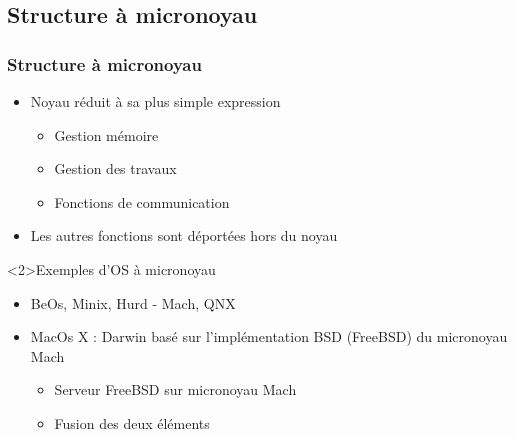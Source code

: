 \subsection{Structure à micronoyau}

\begin{frame}
\frametitle{Structure à micronoyau}
\begin{itemize}
\item Noyau réduit à sa plus simple expression
\begin{itemize}
\item Gestion mémoire
\item Gestion des travaux
\item Fonctions de communication
\end{itemize}
\item Les autres fonctions sont déportées hors du noyau
\end{itemize}
\begin{exampleblock}<2>{Exemples d'OS à micronoyau}
\begin{itemize}
\item BeOs, Minix, Hurd - Mach, QNX

\item MacOs X : Darwin basé sur l'implémentation BSD (FreeBSD) du micronoyau Mach
\begin{itemize}
\item Serveur FreeBSD sur micronoyau Mach
\item Fusion des deux éléments
\end{itemize}
\end{itemize}


\end{exampleblock}
\end{frame}


